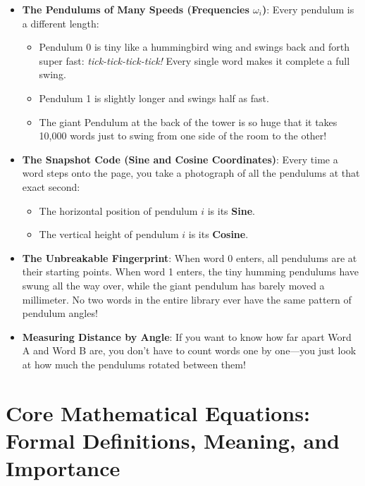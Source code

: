 \documentclass[11pt,a4paper]{article}
\theoremstyle{definition}
\begin{document}
\begin{itemize}
    \item \textbf{The Pendulums of Many Speeds (Frequencies $\omega_i$)}:
    Every pendulum is a different length:
    \begin{itemize}
        \item Pendulum 0 is tiny like a hummingbird wing and swings back and forth super fast: \emph{tick-tick-tick-tick!} Every single word makes it complete a full swing.
        \item Pendulum 1 is slightly longer and swings half as fast.
        \item The giant Pendulum at the back of the tower is so huge that it takes 10,000 words just to swing from one side of the room to the other!
    \end{itemize}
    
    \item \textbf{The Snapshot Code (Sine and Cosine Coordinates)}:
    Every time a word steps onto the page, you take a photograph of all the pendulums at that exact second:
    \begin{itemize}
        \item The horizontal position of pendulum $i$ is its \textbf{Sine}.
        \item The vertical height of pendulum $i$ is its \textbf{Cosine}.
    \end{itemize}
    
    \item \textbf{The Unbreakable Fingerprint}:
    When word 0 enters, all pendulums are at their starting points.
    When word 1 enters, the tiny humming pendulums have swung all the way over, while the giant pendulum has barely moved a millimeter.
    No two words in the entire library ever have the same pattern of pendulum angles!
    
    \item \textbf{Measuring Distance by Angle}:
    If you want to know how far apart Word A and Word B are, you don't have to count words one by one—you just look at how much the pendulums rotated between them!
\end{itemize}

\section{Core Mathematical Equations: Formal Definitions, Meaning, and Importance}
\end{document}

